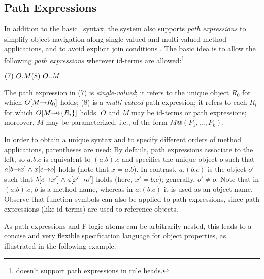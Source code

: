 \subsection{Path Expressions}

In addition to the basic \fl\ syntax, the \FLIP  system also supports
\emph{path expressions} to simplify object navigation along
single-valued and multi-valued method applications, and to avoid
explicit join conditions \cite{frohn-lausen-uphoff-VLDB-94}.  The
basic idea is to allow the following \emph{path expressions} wherever
id-terms are allowed:\footnote{
  \FLIP doesn't support path expressions in rule
  heads.
  }

  \medskip

\begin{math}
  \hfill (7)~O.M \hfill (8)~O..M \hfill
\end{math} \medskip

\NI The path expression in (7) is \emph{single-valued}; it refers to
the unique object $R_0$ for which $O[M{\rightarrow} R_0]$ holds; (8) is a
\emph{multi-valued} path expression; it refers to each $R_i$ for which
$O[M{\rightarrow\!\!\!\!\rightarrow}\{R_i\}]$ holds. $O$ and $M$ may be id-terms or path
expressions; moreover, $M$ may be parameterized, i.e., of the form
$M@(P_1,\dots,P_k)$.
  
In order to obtain a unique syntax and to specify different orders of
method applications, parentheses are used: By default, path
expressions associate to the left, so $a.b.c$ is equivalent to
$(a.b).c$ and specifies the unique object $o$ such that $a[b{\rightarrow} x]
\land x[c{\rightarrow} o]$ holds (note that $x=a.b$). In contrast, $a.(b.c)$ is
the object $o'$ such that $b[c{\rightarrow} x'] \land a[x'{\rightarrow} o']$ holds (here,
$x'=b.c$); generally, $o'\neq o$. Note that in $(a.b).c$, $b$ is a
method name, whereas in $a.(b.c)$ it is used as an object name.
Observe that function symbols can also be applied to path
expressions, since path expressions (like id-terms) are used to
reference objects.
  
As path expressions and F-logic atoms can be arbitrarily nested, this leads
to a concise and very flexible specification language for object
properties, as illustrated in the following example.

